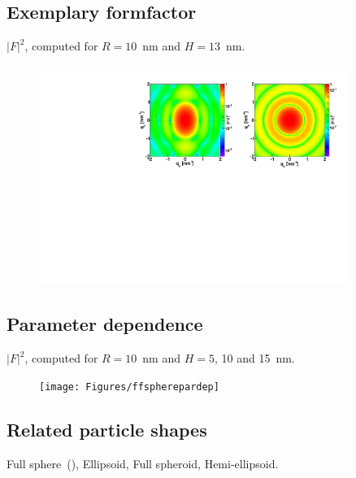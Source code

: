 \subsection{Exemplary formfactor}
$|F|^2$, computed for $R=10$~nm and $H=13$~nm.
\begin{figure}[h]
\begin{center}
\includegraphics[width=0.9\textwidth]{Figures/figffsphere}
\end{center}
\end{figure}

\par

\subsection{Parameter dependence}
$|F|^2$, computed for $R=10$~nm and $H=5$, 10 and 15~nm.
\begin{figure}[h]
\begin{center}
\texttt{[image: Figures/ffspherepardep]}
\end{center}
\end{figure}


\subsection{Related particle shapes}
Full sphere~(), Ellipsoid, Full spheroid, Hemi-ellipsoid.

